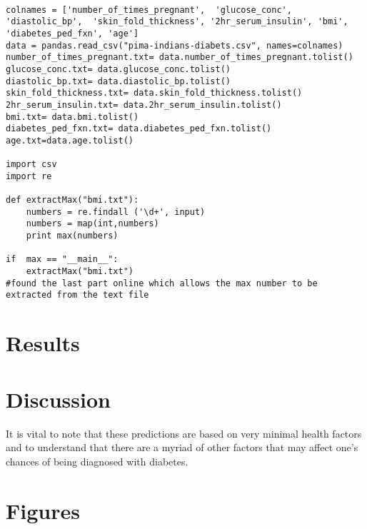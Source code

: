 \documentclass [letterpaper]{article}
\begin{document}
\begin{lstlisting}

colnames = ['number_of_times_pregnant',  'glucose_conc',  'diastolic_bp',  'skin_fold_thickness', '2hr_serum_insulin', 'bmi', 'diabetes_ped_fxn', 'age']
data = pandas.read_csv("pima-indians-diabets.csv", names=colnames)
number_of_times_pregnant.txt= data.number_of_times_pregnant.tolist()
glucose_conc.txt= data.glucose_conc.tolist()
diastolic_bp.txt= data.diastolic_bp.tolist()
skin_fold_thickness.txt= data.skin_fold_thickness.tolist()
2hr_serum_insulin.txt= data.2hr_serum_insulin.tolist()
bmi.txt= data.bmi.tolist()
diabetes_ped_fxn.txt= data.diabetes_ped_fxn.tolist()
age.txt=data.age.tolist()

import csv
import re

def extractMax("bmi.txt"):
	numbers = re.findall ('\d+', input)
	numbers = map(int,numbers)
	print max(numbers)

if	max == "__main__":
	extractMax("bmi.txt")
#found the last part online which allows the max number to be extracted from the text file

\end{lstlisting}

\section{Results}

\section{Discussion}
It is vital to note that these predictions are based on very minimal health factors and to understand that there are a myriad of other factors that may affect one's chances of being diagnosed with diabetes.

\section{Figures}
\end{document}

